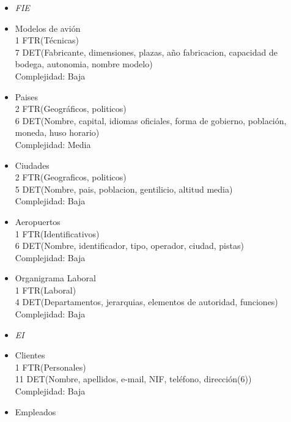 \begin{enumerate}
\begin{itemize}
			\end{itemize}
			\begin{itemize}
			\item\textit{FIE}
				\item Modelos de avión \\
					1 FTR(Técnicas) \\
					7 DET(Fabricante, dimensiones, plazas, año fabricacion, capacidad de bodega, autonomia, nombre modelo) \\
					Complejidad: Baja\\
				\item Paises \\
					2 FTR(Geográficos, politicos) \\
					6 DET(Nombre, capital, idiomas oficiales, forma de gobierno, población, moneda, huso horario) \\
					Complejidad: Media\\	
				\item Ciudades \\
					2 FTR(Geograficos, politicos) \\
					5 DET(Nombre, pais, poblacion, gentilicio, altitud media) \\
					Complejidad: Baja\\
				\item Aeropuertos \\
					1 FTR(Identificativos) \\
					6 DET(Nombre, identificador, tipo, operador, ciudad, pistas) \\
					Complejidad: Baja\\
				\item Organigrama Laboral \\
					1 FTR(Laboral) \\
					4 DET(Departamentos, jerarquias, elementos de autoridad, funciones) \\
					Complejidad: Baja\\
			\end{itemize}
			\begin{itemize}
			\item \textit{EI}
				\item Clientes \\
					1 FTR(Personales) \\
					11 DET(Nombre, apellidos, e-mail, NIF, teléfono, dirección(6)) \\
					Complejidad: Baja\\
				\item Empleados \\

\end{itemize}
\end{enumerate}
